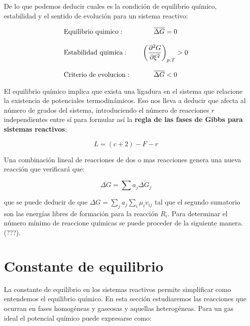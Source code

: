 \documentclass[12pt,a4paper,oneside]{book}
\begin{document}
De lo que podemos deducir cuales es la condición de equilibrio químico, estabilidad y el sentido de evolución para un sistema reactivo:

\begin{equation}
\begin{array}{llc}
\mathrm{Equilibrio \ quimico:} & & \overline{\Delta G} = 0 \\ \\
\mathrm{Estabilidad \ quimica:} & &  \left( \dfrac{\partial^2 G }{\partial \xi ^2} \right)_{p,T} > 0   \\ \\
\mathrm{Criterio \ de \ evolucion:} & & \overline{\Delta G} < 0 
\end{array}
\end{equation}

El equilibrio químico implica que exista una ligadura en el sistema que relacione la existencia de potenciales termodinámicos. Eso nos lleva a deducir que afecta al número de grados del sistema, introduciendo el número de reacciones $r$ independientes entre sí para formular así la \textbf{regla de las fases de Gibbs para sistemas reactivos}:

\begin{equation}
L = (c+2)-F-r
\end{equation}

Una combinación lineal de reacciones de dos o mas reacciones genera una nueva reacción que verificará que:

\begin{equation}
\overline{\Delta G} = \sum a_j \overline{\Delta G_j} \label{ec:4.19}
\end{equation}

que se puede deducir de que $\Delta G = \sum_j a_j  \sum_i \mu_i v_{ij} $ tal que el segundo sumatorio son las energías libres de formación para la reacción $R_i$. Para determinar el número mínimo de reaccione químicas se puede proceder de la siguiente manera. (???).

\section{Constante de equilibrio}

La constante de equilibrio en los sistemas reactivos permite simplificar como entendemos el equilibrio químico. En esta sección estudiaremos las reacciones que ocurran en fases homogéneas y gaseosas y aquellas heterogéneas. Para un gas ideal el potencial químico puede expresarse como:
\end{document}

